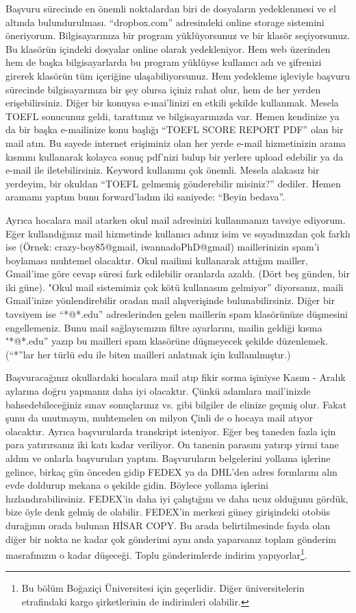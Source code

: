 \documentclass[12pt]{article}
\begin{document}
Başvuru sürecinde en önemli noktalardan biri de dosyaların yedeklenmesi ve el altında bulundurulması. “dropbox.com” adresindeki online storage sistemini öneriyorum. Bilgisayarınıza bir program yüklüyorsunuz ve bir klasör seçiyorsunuz. Bu klasörün içindeki dosyalar online olarak yedekleniyor. Hem web üzerinden hem de başka bilgisayarlarda bu program yüklüyse kullanıcı adı ve şifrenizi girerek klasörün tüm içeriğine ulaşabiliyorsunuz.  Hem yedekleme işleviyle başvuru sürecinde bilgisayarınıza bir şey olursa içiniz rahat olur, hem de her yerden erişebilirsiniz. Diğer bir konuysa e-mai’linizi en etkili şekilde kullanmak. Mesela TOEFL sonucunuz geldi, tarattınız ve bilgisayarınızda var. Hemen kendinize ya da bir başka e-mailinize konu başlığı “TOEFL SCORE REPORT PDF” olan bir mail atın. Bu sayede internet erişiminiz olan her yerde e-mail hizmetinizin arama kısmını kullanarak kolayca sonuç pdf’nizi bulup bir yerlere upload edebilir ya da e-mail ile iletebilirsiniz. Keyword kullanımı çok önemli. Mesela alakasız bir yerdeyim, bir okuldan “TOEFL gelmemiş gönderebilir misiniz?” dediler. Hemen aramamı yaptım bunu forward’ladım iki saniyede: “Beyin bedava”.


Ayrıca hocalara mail atarken okul mail adresinizi kullanmanızı tavsiye ediyorum. Eğer kullandığınız mail hizmetinde kullanıcı adınız isim ve soyadınızdan çok farklı ise (Örnek: crazy-boy85@gmail, iwannadoPhD@gmail) maillerinizin spam’i boylaması muhtemel olacaktır. Okul mailimi kullanarak attığım mailler, Gmail’ime göre cevap süresi fark edilebilir oranlarda azaldı. (Dört beş günden, bir iki güne). "Okul mail sistemimiz çok kötü kullanasım gelmiyor” diyorsanız, maili Gmail’inize yönlendirebilir oradan mail alışverişinde bulunabilirsiniz. Diğer bir tavsiyem ise ``*@*.edu'' adreslerinden gelen maillerin spam klasörünüze düşmesini engellemeniz. Bunu mail sağlayıcınızın filtre ayarlarını, mailin geldiği kısma "*@*.edu” yazıp bu mailleri spam klasörüne düşmeyecek şekilde düzenlemek. (``*''lar her türlü edu ile biten mailleri anlatmak için kullanılmıştır.)

Başvuracağınız okullardaki hocalara mail atıp fikir sorma işiniyse Kasım - Aralık aylarına doğru yapmanız daha iyi olacaktır. Çünkü adamlara mail’inizde bahsedebileceğiniz sınav sonuçlarınız vs. gibi bilgiler de elinize geçmiş olur. Fakat şunu da unutmayın, muhtemelen on milyon Çinli de o hocaya mail atıyor olacaktır. Ayrıca başvurularda transkript isteniyor. Eğer beş taneden fazla için para yatırırsanız iki katı kadar veriliyor. On tanenin parasını yatırıp yirmi tane aldım ve onlarla başvuruları yaptım. Başvuruların belgelerini yollama işlerine gelince, birkaç gün önceden gidip FEDEX ya da DHL’den adres formlarını alın evde doldurup mekana o şekilde gidin. Böylece yollama işlerini hızlandırabilirsiniz. FEDEX’in daha iyi çalıştığını ve daha ucuz olduğunu gördük, bize öyle denk gelmiş de olabilir. FEDEX’in merkezi güney girişindeki otobüs durağının orada bulunan HİSAR COPY. Bu arada belirtilmesinde fayda olan diğer bir nokta ne kadar çok gönderimi aynı anda yaparsanız toplam gönderim masrafınızın o kadar düşeceği. Toplu gönderimlerde indirim yapıyorlar\footnote{Bu bölüm Boğaziçi Üniversitesi için geçerlidir. Diğer üniversitelerin etrafindaki kargo şirketlerinin de indirimleri olabilir.}.
\end{document}
